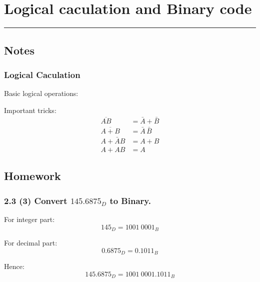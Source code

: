 \section{Logical caculation and Binary code}
\vspace{-15pt}\noindent\rule{\textwidth}{0.1pt}\vspace{-10pt}
    \subsection{Notes}
    \subsubsection*{Logical Caculation}

    Basic logical operations:
    \small{}

    Important tricks:
    \begin{align}
        \overline{AB}   &= \bar{A} + \bar{B}\\
        \overline{A+B}  &= \bar{A} \,\bar{B}\\
        A + \bar{A}B    &= A + B\\
        A + AB          &= A
    \end{align}

    \subsection{Homework}
    \subsubsection{2.3 (3) \textnormal{Convert $145.6875_D$ to Binary}.}
    {\color{hwSolution}
        For integer part: \[145_D = 1001~0001_B\]

        For decimal part: \[0.6875_D = 0.1011_B\]

        Hence:            \[145.6875_D = 1001~0001.1011_B\]
    }
